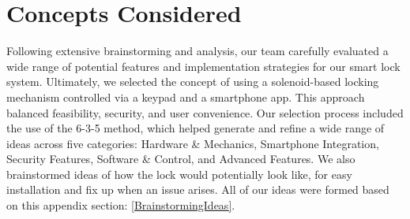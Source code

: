 \newpage
\section{Concepts Considered}


Following extensive brainstorming and analysis, our team carefully evaluated a wide range of potential features and implementation strategies for our smart lock system. Ultimately, we selected the concept of using a solenoid-based locking mechanism controlled via a keypad and a smartphone app. This approach balanced feasibility, security, and user convenience. Our selection process included the use of the 6-3-5 method, which helped generate and refine a wide range of ideas across five categories: Hardware \& Mechanics, Smartphone Integration, Security Features, Software \& Control, and Advanced Features. We also brainstormed ideas of how the lock would potentially look like, for easy installation and fix up when an issue arises. All of our ideas were formed based on this appendix section: \ref{BrainstormingIdeas}.


